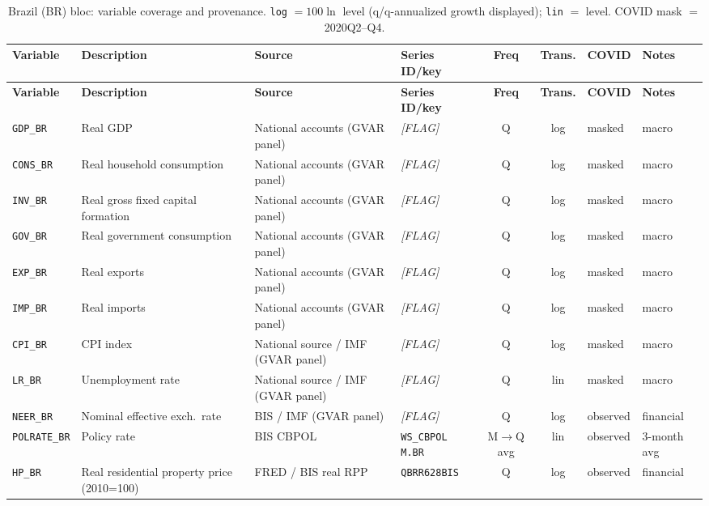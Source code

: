 {\footnotesize
\begin{longtable}{@{}llp{2.5cm}p{2.4cm}cclp{2.6cm}@{}}
\caption{Brazil (BR) bloc: variable coverage and provenance. \texttt{log}
$=100\ln$ level (q/q-annualized growth displayed); \texttt{lin} $=$ level.
COVID mask $=$ 2020Q2--Q4.}\label{tab:data:BR}\\
\toprule
\textbf{Variable} & \textbf{Description} & \textbf{Source} & \textbf{Series ID/key} & \textbf{Freq} & \textbf{Trans.} & \textbf{COVID} & \textbf{Notes} \\
\midrule
\endfirsthead
\toprule
\textbf{Variable} & \textbf{Description} & \textbf{Source} & \textbf{Series ID/key} & \textbf{Freq} & \textbf{Trans.} & \textbf{COVID} & \textbf{Notes} \\
\midrule
\endhead
\bottomrule
\endfoot
\texttt{GDP\_BR}  & Real GDP & National accounts (GVAR panel) & \textit{[FLAG]} & Q & log & masked & macro \\
\texttt{CONS\_BR} & Real household consumption & National accounts (GVAR panel) & \textit{[FLAG]} & Q & log & masked & macro \\
\texttt{INV\_BR}  & Real gross fixed capital formation & National accounts (GVAR panel) & \textit{[FLAG]} & Q & log & masked & macro \\
\texttt{GOV\_BR}  & Real government consumption & National accounts (GVAR panel) & \textit{[FLAG]} & Q & log & masked & macro \\
\texttt{EXP\_BR}  & Real exports & National accounts (GVAR panel) & \textit{[FLAG]} & Q & log & masked & macro \\
\texttt{IMP\_BR}  & Real imports & National accounts (GVAR panel) & \textit{[FLAG]} & Q & log & masked & macro \\
\texttt{CPI\_BR}  & CPI index & National source / IMF (GVAR panel) & \textit{[FLAG]} & Q & log & masked & macro \\
\texttt{LR\_BR}   & Unemployment rate & National source / IMF (GVAR panel) & \textit{[FLAG]} & Q & lin & masked & macro \\
\texttt{NEER\_BR} & Nominal effective exch.\ rate & BIS / IMF (GVAR panel) & \textit{[FLAG]} & Q & log & observed & financial \\
\texttt{POLRATE\_BR} & Policy rate & BIS CBPOL & \texttt{WS\_CBPOL M.BR} & M$\to$Q avg & lin & observed & 3-month avg \\
\texttt{HP\_BR}   & Real residential property price (2010=100) & FRED / BIS real RPP & \texttt{QBRR628BIS} & Q & log & observed & financial \\

\end{longtable}}
